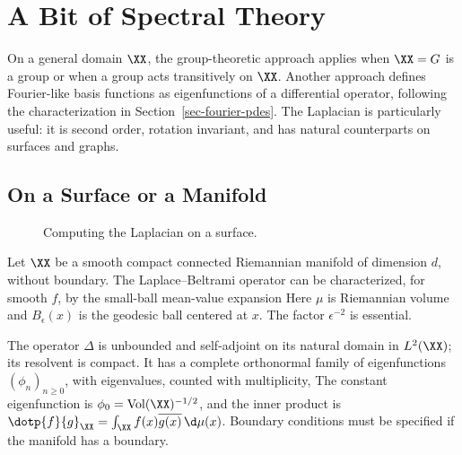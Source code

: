 %

\section{A Bit of Spectral Theory}

On a general domain $\XX$, the group-theoretic approach applies when $\XX=G$ is a group or when a group acts transitively on $\XX$. Another approach defines Fourier-like basis functions as eigenfunctions of a differential operator, following the characterization in Section~\ref{sec-fourier-pdes}. The Laplacian is particularly useful: it is second order, rotation invariant, and has natural counterparts on surfaces and graphs.


\subsection{On a Surface or a Manifold}

\begin{figure}[tbp]
\centering
{}
\caption{Computing the Laplacian on a surface.}
\label{fig-review-fourier-laplacian-surface}
\end{figure}
Let $\XX$ be a smooth compact connected Riemannian manifold of dimension $d$, without boundary. The Laplace--Beltrami operator can be characterized, for smooth $f$, by the small-ball mean-value expansion
Here $\mu$ is Riemannian volume and $B_\epsilon(x)$ is the geodesic ball centered at $x$. The factor $\epsilon^{-2}$ is essential.

The operator $\Delta$ is unbounded and self-adjoint on its natural domain in $L^2(\XX)$; its resolvent is compact. It has a complete orthonormal family of eigenfunctions $(\phi_n)_{n\geq0}$, with eigenvalues, counted with multiplicity,
The constant eigenfunction is $\phi_0=\mathrm{Vol}(\XX)^{-1/2}$, and the inner product is $\dotp{f}{g}_\XX=\int_\XX f(x)\overline{g(x)}\,\d\mu(x)$. Boundary conditions must be specified if the manifold has a boundary.

